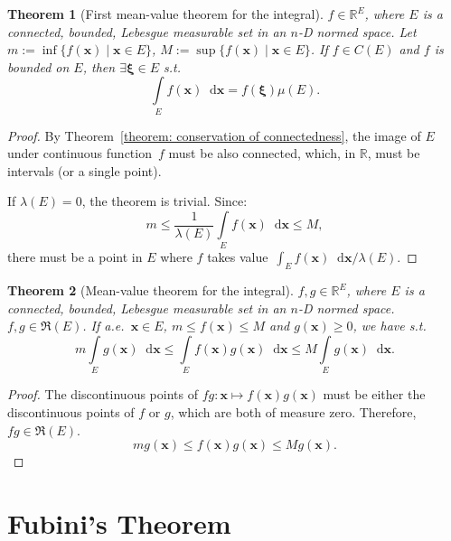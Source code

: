 \documentclass[openany]{book}
\theoremstyle{plain}
\newtheorem{theorem}{Theorem}[section] %
\theoremstyle{definition}
\newcommand{\dif}{\mathop{}\!\mathrm{d}} %
\newcommand*{\bv}{\boldsymbol} %
\begin{document}
\begin{theorem}[First mean-value theorem for the integral]
	\label{theorem: first mean-value theorem for the integral}
	$f \in \mathbb R^E$, where $E$ is a connected, bounded, Lebesgue measurable set in an $n$-D normed space. 
	Let $m := \inf\{f(\bv x) \mid \bv x \in E\}$, $M := \sup\{f(\bv x) \mid \bv x \in E\}$.
	If $f \in C(E)$ and $f$ is bounded on $E$, then $\exists \bv \xi \in E$ s.t.\ 
	\begin{equation*}
		\int\limits_E f(\bv x) \dif \bv x = f(\bv \xi) \mu(E).
	\end{equation*}
\end{theorem}
\begin{proof}
	By Theorem~\ref{theorem: conservation of connectedness}, the image of $E$ under continuous function~$f$ must be also connected, which, in $\mathbb R$, must be intervals (or a single point).

	If $\lambda(E) = 0$, the theorem is trivial. 
	Since:
	\begin{equation*}
		m \leq \frac{1}{\lambda (E)} \int\limits_E f(\bv x) \dif \bv x \leq M, 
	\end{equation*}
	there must be a point in $E$ where $f$ takes value~$\int_E f(\bv x) \dif \bv x / \lambda(E)$.
\end{proof}

\begin{theorem}[Mean-value theorem for the integral]
	\label{theorem: mean-value theorem for the integral}
	$f, g \in \mathbb R^E$, where $E$ is a connected, bounded, Lebesgue measurable set in an $n$-D normed space. 
	$f, g \in \mathfrak R(E)$. 
	If a.e.\ $\bv x \in E$, $m \leq f(\bv x) \leq M$ and $g(\bv x) \geq 0$, we have
	s.t.\ 
	\begin{equation*}
		m \int\limits_E g(\bv x) \dif \bv x 
			\leq \int\limits_E f(\bv x) g(\bv x)\dif \bv x 
			\leq M \int\limits_E g(\bv x) \dif \bv x.
	\end{equation*}
\end{theorem}
\begin{proof}
	The discontinuous points of $fg \colon \bv x \mapsto f(\bv x)g(\bv x)$ must be either the discontinuous points of $f$ or $g$, which are both of measure zero. Therefore, $fg \in \mathfrak R(E)$.
	\begin{equation*}
		m g(\bv x) \leq f(\bv x) g(\bv x) \leq M g(\bv x).
	\end{equation*}
\end{proof}

\section{Fubini's Theorem}
\end{document}
